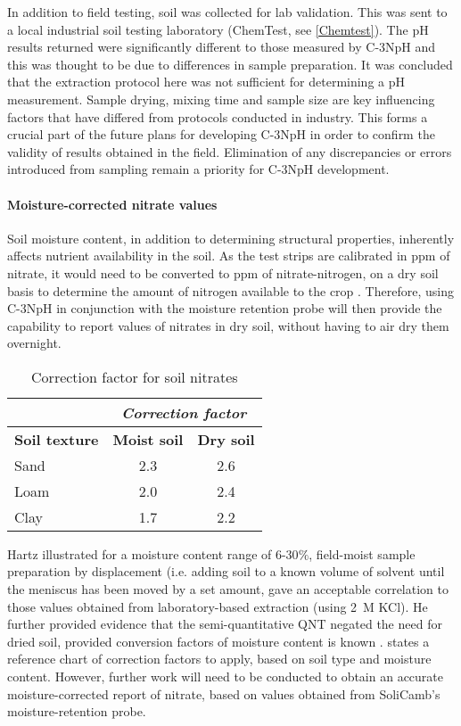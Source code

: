 In addition to field testing, soil was collected for lab validation. This was sent to a local industrial soil testing laboratory (ChemTest, see \cref{Chemtest}). The pH results returned were significantly different to those measured by C-3NpH and this was thought to be due to differences in sample preparation. It was concluded that the extraction protocol here was not sufficient for determining a pH measurement. Sample drying, mixing time and sample size are key influencing factors that have differed from protocols conducted in industry. This forms a crucial part of the future plans for developing C-3NpH in order to confirm the validity of results obtained in the field. Elimination of any discrepancies or errors introduced from sampling remain a priority for C-3NpH development.

\paragraph{Moisture-corrected nitrate values}

Soil moisture content, in addition to determining structural properties, inherently affects nutrient availability in the soil. As the test strips are calibrated in ppm of nitrate, it would need to be converted to ppm of nitrate-nitrogen, on a dry soil basis to determine the amount of nitrogen available to the crop \cite{moisturenitrate}.
Therefore, using C-3NpH in conjunction with the moisture retention probe will then provide the capability to report values of nitrates in dry soil, without having to air dry them overnight. 

		\begin{table}[h!]
		\centering
		\begin{tabular} {l c c}
			\toprule
			& \multicolumn{2}{c}{\textit{Correction factor}} \\
			\midrule
			\textbf{Soil texture} & \textbf{Moist soil} & \textbf{Dry soil} \\
			\midrule
			Sand & 2.3 & 2.6 \\
			Loam & 2.0 & 2.4 \\
			Clay & 1.7 & 2.2 \\
			\bottomrule
			\end{tabular}
		\label{table:corrfacnit}
		\caption{Correction factor for soil nitrates \cite{moisturenitrate}}
		\end{table}

 Hartz \cite{Hartz1994} illustrated for a moisture content range of 6-30$\%$, field-moist sample preparation by displacement (i.e. adding soil to a known volume of solvent until the meniscus has been moved by a set amount, gave an acceptable correlation to those values obtained from laboratory-based extraction (using \SI{2}{M} KCl). He further provided evidence that the semi-quantitative \gls{QNT} negated the need for dried soil, provided conversion factors of moisture content is known \cite{Hartz2010}.  states a reference chart of correction factors to apply, based on soil type and moisture content. However, further work will need to be conducted to obtain an accurate moisture-corrected report of nitrate, based on values obtained from SoliCamb’s moisture-retention probe.
 

